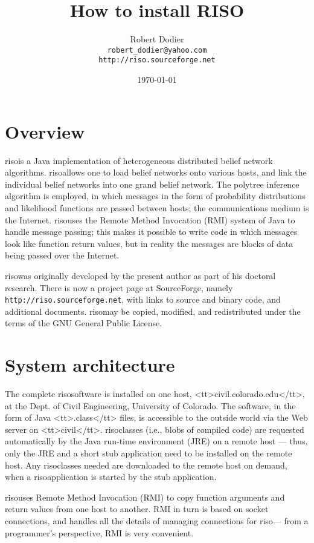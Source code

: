 \documentclass[12pt]{article}
\title{How to install RISO}
\author{Robert Dodier\\{\tt robert\_dodier@yahoo.com}\\{\tt http://riso.sourceforge.net}}
\date{\today}
\newcommand{\RISO}{{\sc riso}}
\begin{document}
\maketitle

\section{Overview}

\RISO is a Java implementation of heterogeneous distributed belief network algorithms.
\RISO allows one to load belief networks onto various hosts,
and link the individual belief networks into one grand belief network.
The polytree inference algorithm is employed, in which messages
in the form of probability distributions and likelihood functions
are passed between hosts; the communications medium is the Internet.
\RISO uses the Remote Method Invocation (RMI) system of Java
to handle message passing; this makes it possible to write code
in which messages look like function return values, but in reality
the messages are blocks of data being passed over the Internet.

\RISO was originally developed by the present author as part of
his doctoral research.
There is now a project page at SourceForge, namely {\tt http://riso.sourceforge.net},
with links to source and binary code, and additional documents.
\RISO may be copied, modified, and redistributed under the terms of the
GNU General Public License.

\section{System architecture}

The complete \RISO software is installed on one host,
<tt>civil.colorado.edu</tt>,
at the Dept. of Civil Engineering, University of Colorado.
The software, in the form of Java <tt>.class</tt> files,
is accessible to the outside world via the Web server on <tt>civil</tt>.
\RISO classes (i.e., blobs of compiled code) are requested automatically
by the Java run-time environment (JRE) on a remote host --- thus, only the JRE 
and a short stub application need to be installed on the remote host.
Any \RISO classes needed are downloaded to the remote host on demand,
when a \RISO application is started by the stub application.

\RISO uses Remote Method Invocation (RMI) to copy function arguments and
return values from one host to another.
RMI in turn is based on socket connections, and handles all the details of
managing connections for \RISO --- from a programmer's perspective, RMI is
very convenient.
\end{document}
